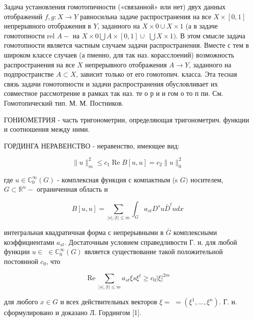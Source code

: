 \documentclass[10pt]{article}
\begin{document}
Задача установления гомотопичности («связанной» или нет) двух данных отображений $f, g: X \rightarrow Y$ равносильна задаче распространения на все $X \times[0,1]$ непрерывного отображения в $Y$, заданного на $X \times 0 \cup X \times 1$ (а в задаче гомотопности rel $A-$ на $X \times 0 \bigcup A \times[0,1] \cup$ $\bigcup X \times 1)$. В этом смысле задача гомотопности является частным случаем задачи распространения. Вместе с тем в широком классе случаев (а пменно, для так наз. корасслоений) возможность распространения на все $X$ непрерывного отображения $A \rightarrow Y$, заданного на подпространстве $A \subset X$, зависит только от его гомотопич. класса. Эта тесная связь задачи гомотопности и задачи распространения обусловливает их совместное рассмотрение в рамках так наз. те о р и и гом о то п пи. См. Гомотопический тип. М. М. Постников.



ГОНИОМЕТРИЯ - часть тригонометрии, определяющая тригонометрич. функции и соотношения между ними.



ГОРДИНГА НЕРАВЕНСТВО - неравенство, имеющее вид:



\[

\|u\|_{m}^{2} \leqslant c_{1} \operatorname{Re} B[u, u]=c_{2}\|u\|_{0}^{2}

\]



где $u \in \mathbb{C}_{0}^{\infty}(G)$ - комплексная функция с компактным (s $G)$ носителем, $G \subset \mathbb{R}^{n}-$ ограниченная область и



\[

B[u, u]=\sum_{|s|,|t| \leqslant m} \int_{G} a_{s t} D^{s} u \bar{D}^{t} u d x

\]



интегральная квадратичная форма с непрерывными в $\bar{G}$ комплексными коэффициентами $a_{s t}$. Достаточным условием справедливости Г. н. для любой функции $u \in$ $\in \mathbb{C}_{0}^{\infty}(G)$ является существование такой положительной постоянной $c_{0}$, что



\[

\operatorname{Re} \sum_{|s|,|t| \leqslant m} a_{s t} \xi s \xi^{t} \geqslant c_{0}|\xi|^{2 m}

\]



для любого $x \in G$ и всех действительных векторов $\xi=$ $=\left(\xi^{1}, \ldots, \xi^{n}\right)$. Г. н. сформулировано и доказано Л. Гордингом [1].
\end{document}
